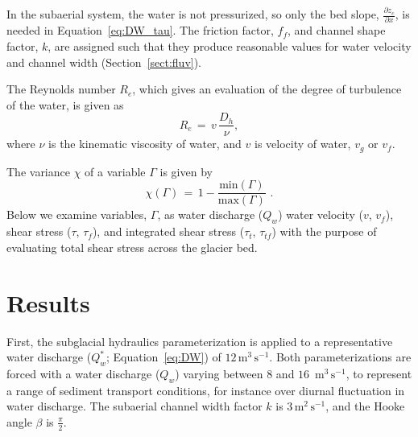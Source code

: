 \documentclass[11pt]{article}
\newcommand{\unit}[1]{$\mathrm{#1}$}
\begin{document}
\begin{spacing}{1}
  In the subaerial system, the water is not pressurized, so only the bed slope, $\frac{\partial z_c}{\partial x}$, is needed in Equation~\ref{eq:DW_tau}. The friction factor, $f_f$, and channel shape factor, $k$, are assigned such that they produce reasonable values for water velocity and channel width  (Section~\ref{sect:fluv}).
  
  The Reynolds number $R_e$, which gives an evaluation of the degree of turbulence of the water, is given as 
  \begin{equation}
    \label{eq:re}
    R_e\,=\, v \,\frac{D_h}{\nu},
  \end{equation}
  \noindent where $\nu$ is the kinematic viscosity of water, and  $v$ is velocity of water, $v_g$ or $v_f$.
  
  The variance $ \chi$ of a variable $\Gamma$ is given by 
  \begin{equation}
    \label{eq:var}
    \chi(\Gamma) \,=\, 1 - \frac{\mathrm{min}(\Gamma)}{\mathrm{max}(\Gamma)}\,\,.
  \end{equation}
  \noindent Below we examine variables, $\Gamma$, as water discharge ($Q_w$) water velocity ($v$, $v_f$), shear stress ($\tau$, $\tau_f$), and integrated shear stress ($\tau_t$, $\tau_{tf}$) with the purpose of evaluating total shear stress across the glacier bed.
  
  
  \section{Results}
  First, the subglacial hydraulics parameterization is applied to a representative water discharge ($Q_w^*$; Equation~\ref{eq:DW}) of $12$\,\unit{m}$^{3}$\,\unit{s}$^{-1}$.
  Both parameterizations are forced with a water discharge ($Q_w$) varying between $8$ and $16$ \,\unit{m}$^{3}$\,\unit{s}$^{-1}$, to represent a range of sediment transport conditions, for instance over diurnal fluctuation in water discharge. The subaerial channel width factor $k$ is $3$\,\unit{m}$^{2}$\,\unit{s}$^{-1}$, and the Hooke angle $\beta$ is $\frac{\pi}{2}$.
  

\end{spacing}
\end{document}
